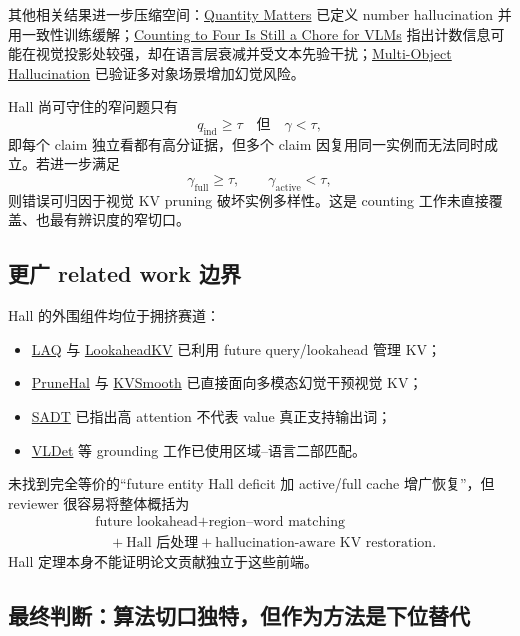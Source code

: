 \documentclass[UTF8,zihao=-4,a4paper]{ctexart}
\begin{document}
其他相关结果进一步压缩空间：\href{https://arxiv.org/abs/2403.01373}{Quantity Matters} 已定义 number hallucination 并用一致性训练缓解；\href{https://arxiv.org/abs/2604.10039}{Counting to Four Is Still a Chore for VLMs} 指出计数信息可能在视觉投影处较强，却在语言层衰减并受文本先验干扰；\href{https://arxiv.org/abs/2407.06192}{Multi-Object Hallucination} 已验证多对象场景增加幻觉风险。

Hall 尚可守住的窄问题只有
\[
q_{\mathrm{ind}}\ge\tau
\quad\text{但}\quad
\gamma<\tau,
\]
即每个 claim 独立看都有高分证据，但多个 claim 因复用同一实例而无法同时成立。若进一步满足
\[
\gamma_{\mathrm{full}}\ge\tau,
\qquad
\gamma_{\mathrm{active}}<\tau,
\]
则错误可归因于视觉 KV pruning 破坏实例多样性。这是 counting 工作未直接覆盖、也最有辨识度的窄切口。

\subsection{更广 related work 边界}

Hall 的外围组件均位于拥挤赛道：
\begin{itemize}
  \item \href{https://arxiv.org/abs/2505.20334}{LAQ} 与 \href{https://arxiv.org/abs/2603.10899}{LookaheadKV} 已利用 future query/lookahead 管理 KV；
  \item \href{https://arxiv.org/abs/2510.19183}{PruneHal} 与 \href{https://arxiv.org/abs/2602.04268}{KVSmooth} 已直接面向多模态幻觉干预视觉 KV；
  \item \href{https://openaccess.thecvf.com/content/CVPR2026/papers/Wang_Same_Attention_Different_Truths_Put_Logit-Lens_over_Visual_Attention_to_CVPR_2026_paper.pdf}{SADT} 已指出高 attention 不代表 value 真正支持输出词；
  \item \href{https://openreview.net/forum?id=mjHlitXvReu}{VLDet} 等 grounding 工作已使用区域--语言二部匹配。
\end{itemize}

未找到完全等价的“future entity Hall deficit 加 active/full cache 增广恢复”，但 reviewer 很容易将整体概括为
\[
\begin{aligned}
&\text{future lookahead}+\text{region--word matching}\\
&\quad+\text{Hall 后处理}
+\text{hallucination-aware KV restoration}.
\end{aligned}
\]
Hall 定理本身不能证明论文贡献独立于这些前端。

\subsection{最终判断：算法切口独特，但作为方法是下位替代}
\end{document}
